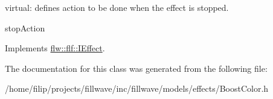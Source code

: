 virtual\+: defines action to be done when the effect is stopped. 

stop\+Action 

Implements \hyperlink{classflw_1_1flf_1_1IEffect_a1a03eaf63a9d4edbd8764540d2d4133c}{flw\+::flf\+::\+I\+Effect}.



The documentation for this class was generated from the following file\+:\begin{DoxyCompactItemize}
\item 
/home/filip/projects/fillwave/inc/fillwave/models/effects/Boost\+Color.\+h\end{DoxyCompactItemize}
